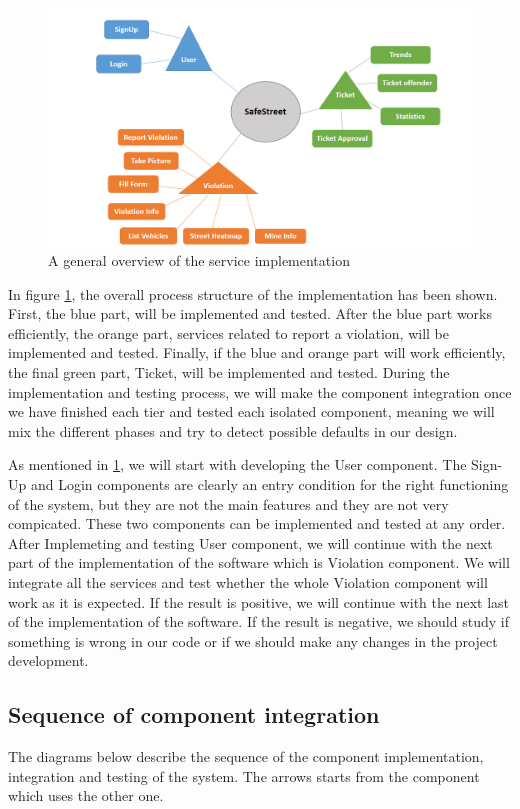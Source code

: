 \begin{figure}
\centering
\includegraphics[width=\textwidth]{Images/ImplemetationandTest.png}
\caption{\label{fig:Test} A general overview of the service implementation}
\end{figure}

In ﬁgure \ref{fig:Test}, the overall process structure of the implementation has been shown. First, the blue part, will be implemented and tested. After the blue part works eﬃciently, the orange part, services related to report a violation, will be implemented and tested. Finally, if the blue and orange part will work eﬃciently, the ﬁnal green part, Ticket, will be implemented and tested. During the implementation and testing process, we will make the component integration once we have ﬁnished each tier and tested each isolated component, meaning we will mix the diﬀerent phases and try to detect possible defaults in our design.

As mentioned in \ref{fig:Test}, we will start with developing the User component. The Sign-Up and Login components are clearly an entry condition for the right functioning of the system, but they are not the main features and they are not very compicated. These two components can be implemented and tested at any order. After Implemeting and testing User component, we will continue with the next part of the implementation of the software which is Violation component. We will integrate all the services and test whether the whole Violation component will work as it is expected. If the result is positive, we will continue with the next last of the implementation of the software. If the result is negative, we should study if something is wrong in our code or if we should make any changes in the project development.

\subsection{Sequence of component integration}
The diagrams below describe the sequence of the component implementation, integration and testing of the system. The arrows starts from the component which uses the other one.

